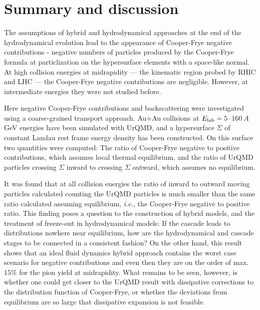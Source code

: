 \section{Summary and discussion}

The assumptions of hybrid and hydrodynamical approaches at the end of the
hydrodynamical evolution lead to the appearance of Cooper-Frye negative
contributions - negative numbers of particles produced by the Cooper-Frye
formula at particlization on the hypersurface elements with a space-like
normal. At high collision energies at midrapidity --- the kinematic region probed by
RHIC and LHC --- the Cooper-Frye negative contributions are negligible. However,
at intermediate energies they were not studied before.

Here negative Cooper-Frye contributions and
backscattering were investigated using a coarse-grained transport
approach. Au+Au collisions at $E_\mathrm{lab} = 5$--$160\ A$ GeV energies have
been simulated with UrQMD, and a hypersurface $\Sigma$ of constant
Landau rest frame energy density has been constructed. On this surface
two quantities were computed: The ratio of Cooper-Frye negative
to positive contributions, which assumes local thermal equilibrium,
and the ratio of UrQMD particles crossing $\Sigma$ inward to crossing
$\Sigma$ outward, which assumes no equilibrium.

It was found that at all collision energies the ratio of inward to outward
moving particles calculated counting the UrQMD particles is much
smaller than the same ratio calculated assuming equilibrium,
\emph{i.e.}, the Cooper-Frye negative to positive ratio. This finding
poses a question to the construction of hybrid models, and the
treatment of freeze-out in hydrodynamical models: If the cascade leads
to distributions nowhere near equilibrium, how are the hydrodynamical
and cascade stages to be connected in a consistent fashion? On the
other hand, this result shows that an ideal fluid dynamics hybrid
approach contains the worst case scenario for negative contributions
and even then they are on the order of max.~$15\%$ for the pion yield
at midrapidity. What remains to be seen, however, is whether one could
get closer to the UrQMD result with dissipative corrections
to the distribution function of Cooper-Frye, or whether the deviations
from equilibrium are so large that dissipative expansion is not
feasible.

